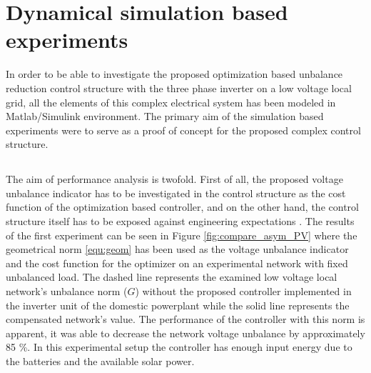     \section{Dynamical simulation based experiments}\label{VUB:sec:Results}
		
    In order to be able to investigate the proposed optimization based unbalance reduction control structure with the three phase inverter on a low voltage local grid, all the elements of this complex electrical system  has been modeled in Matlab/Simulink environment. The primary aim of the simulation based experiments were to serve as a proof of concept for the proposed complex control structure.

    \subsection{}\label{VUB:sec:Performance}

    The aim of performance analysis is twofold. First of all, the proposed voltage unbalance indicator has to be investigated in the control structure as the cost function of the optimization based controller, and on the other hand, the control structure itself has to be exposed against engineering expectations .
    The results of the first experiment can be seen in Figure \ref{fig:compare_asym_PV} where the geometrical norm \ref{equ:geom} has been used as the voltage unbalance indicator and the cost function for the optimizer on an experimental network with fixed unbalanced load.  The dashed line represents the examined low voltage local network's  unbalance norm ($G$) without the proposed controller implemented in the inverter unit of the domestic powerplant while the solid line represents the compensated network's value.
     The performance of the controller with this norm is apparent, it was able to decrease the network voltage unbalance by approximately 85 \%. In this experimental setup the controller has enough input energy due to the batteries and the available solar power.


